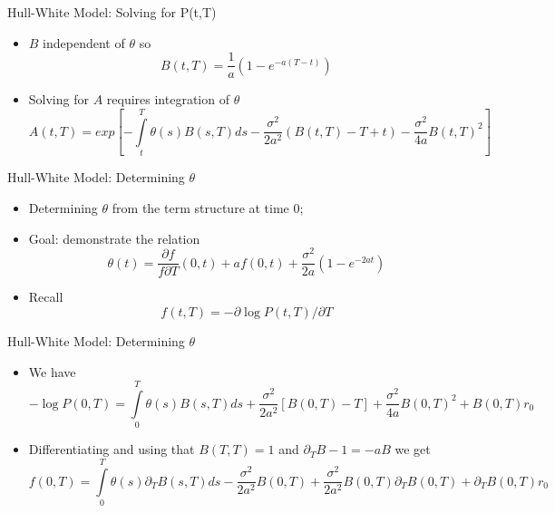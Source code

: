 \documentclass[11pt]{beamer}
\begin{document}
\begin{frame}{Hull-White Model: Solving for P(t,T)}
\begin{itemize}
\item $B$ independent of $\theta$ so
\begin{equation}
B(t,T) = \frac{1}{a} \left( 1 - e^{-a(T-t)} \right)
\end{equation}
\item Solving for $A$ requires integration of $\theta$
\footnotesize
$$
A(t,T) = exp \left[  -\int\limits_t^T \theta(s) B(s,T) ds - 
\frac{\sigma^2}{2a^2} \left( B(t,T) - T + t \right)  -
\frac{\sigma^2}{4a} B(t,T)^2 \right]
$$
\normalsize
\end{itemize}
\end{frame}
\begin{frame}{Hull-White Model: Determining $\theta$} 
\begin{itemize}
\item Determining $\theta$ from the term structure at time $0$;
\item Goal: demonstrate the relation
\begin{equation}
\theta(t) = \frac{\partial f}{f\partial T}(0,t) +a f(0,t) + \frac{\sigma^2}{2a}(1-e^{-2at})
\end{equation}
\item Recall
$$
f(t,T) = -\partial \log P(t,T) / \partial T
$$
\end{itemize}
\end{frame}
\begin{frame}{Hull-White Model: Determining $\theta$}
\begin{itemize}
\item We have
\footnotesize
$$
-\log P(0,T) = \int\limits_0^T \theta(s) B(s,T) ds  + \frac{\sigma^2}{2a^2}   [B(0,T) - T] + \frac{\sigma^2}{4a} B(0,T)^2 + B(0,T) r_0
$$
\normalsize
\item Differentiating and using that $B(T,T)=1$ and $\partial_T B - 1 = -aB$ we get
\footnotesize
$$
f(0,T) = \int\limits_0^T \theta(s) \partial_T B(s,T) ds - \frac{\sigma^2}{2a^2}   B(0,T) + \frac{\sigma^2}{2a^2}   B(0,T) \partial_T B(0,T) + \partial_T B(0,T) r_0
$$
\normalsize
\end{itemize}
\end{frame}
\end{document}
